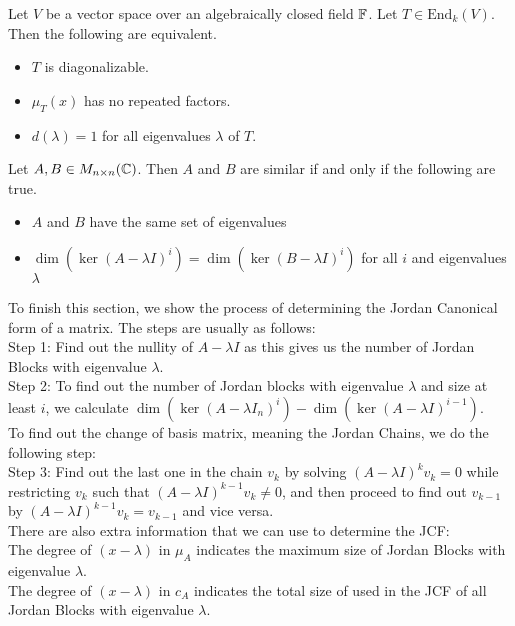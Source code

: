\documentclass[a4paper]{article}
\begin{document}
\begin{prp}{}{} Let $V$ be a vector space over an algebraically closed field $\mathbb{F}$. Let $T\in\text{End}_k(V)$. Then the following are equivalent. 
\begin{itemize}
\item $T$ is diagonalizable. 
\item $\mu_T(x)$ has no repeated factors. 
\item $d(\lambda)=1$ for all eigenvalues $\lambda$ of $T$. 
\end{itemize}
\end{prp}

\begin{prp}{}{} Let $A,B\in M_{n\times n}(\mathbb{C})$. Then $A$ and $B$ are similar if and only if the following are true. 
\begin{itemize}
\item $A$ and $B$ have the same set of eigenvalues
\item $\dim(\ker(A-\lambda I)^i)=\dim(\ker(B-\lambda I)^i)$ for all $i$ and eigenvalues $\lambda$ 
\end{itemize}
\end{prp}

To finish this section, we show the process of determining the Jordan Canonical form of a matrix. The steps are usually as follows: \\
Step 1: Find out the nullity of $A-\lambda I$ as this gives us the number of Jordan Blocks with eigenvalue $\lambda$. \\
Step 2: To find out the number of Jordan blocks with eigenvalue $\lambda$ and size at least $i$, we calculate $\dim(\ker(A-\lambda I_n)^i)-\dim(\ker(A-\lambda I)^{i-1})$. \\
To find out the change of basis matrix, meaning the Jordan Chains, we do the following step: \\
Step 3: Find out the last one in the chain $v_k$ by solving $(A-\lambda I)^kv_k=0$ while restricting $v_k$ such that $(A-\lambda I)^{k-1}v_k\neq 0$, and then proceed to find out $v_{k-1}$ by $(A-\lambda I)^{k-1}v_k=v_{k-1}$ and vice versa. \\

There are also extra information that we can use to determine the JCF: \\
The degree of $(x-\lambda)$ in $\mu_A$ indicates the maximum size of Jordan Blocks with eigenvalue $\lambda$. \\
The degree of $(x-\lambda)$ in $c_A$ indicates the total size of used in the JCF of all Jordan Blocks with eigenvalue $\lambda$. \\
\end{document}
